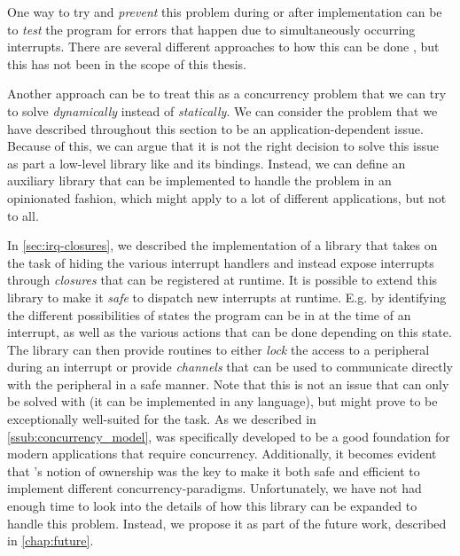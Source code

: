 One way to try and \emph{prevent} this problem during or after implementation can be to \emph{test} the program for errors that happen due to simultaneously occurring interrupts.
There are several different approaches to how this can be done \cite{Higashi2010,Regehr2005}, but this has not been in the scope of this thesis.

Another approach can be to treat this as a concurrency problem that we can try to solve \emph{dynamically} instead of \emph{statically}.
We can consider the problem that we have described throughout this section to be an application-dependent issue.
Because of this, we can argue that it is not the right decision to solve this issue as part a low-level library like {\emlib} and its bindings.
Instead, we can define an auxiliary library that can be implemented to handle the problem in an opinionated fashion, which might apply to a lot of different applications, but not to all.

In \autoref{sec:irq-closures}, we described the implementation of a library that takes on the task of hiding the various interrupt handlers and instead expose interrupts through \emph{closures} that can be registered at runtime.
It is possible to extend this library to make it \emph{safe} to dispatch new interrupts at runtime.
E.g. by identifying the different possibilities of states the program can be in at the time of an interrupt, as well as the various actions that can be done depending on this state.
The library can then provide routines to either \emph{lock} the access to a peripheral during an interrupt or provide \emph{channels} that can be used to communicate directly with the peripheral in a safe manner.
Note that this is not an issue that can only be solved with {\rust} (it can be implemented in any language), but {\rust} might prove to be exceptionally well-suited for the task.
As we described in \autoref{ssub:concurrency_model}, {\rust} was specifically developed to be a good foundation for modern applications that require concurrency.
Additionally, it becomes evident that {\rust}'s notion of ownership was the key to make it both safe and efficient to implement different concurrency-paradigms.
Unfortunately, we have not had enough time to look into the details of how this library can be expanded to handle this problem.
Instead, we propose it as part of the future work, described in \autoref{chap:future}.
